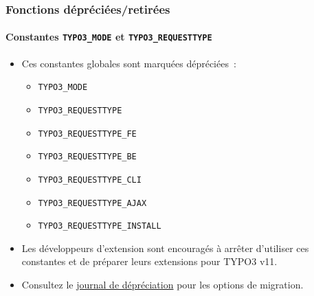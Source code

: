 %

\begin{frame}[fragile]
	\frametitle{Fonctions dépréciées/retirées}
	\framesubtitle{Constantes \texttt{TYPO3\_MODE} et \texttt{TYPO3\_REQUESTTYPE}}

	\begin{itemize}
		\item Ces constantes globales sont marquées dépréciées~:
			\begin{itemize}\smaller
				\item \texttt{TYPO3\_MODE}
				\item \texttt{TYPO3\_REQUESTTYPE}
				\item \texttt{TYPO3\_REQUESTTYPE\_FE}
				\item \texttt{TYPO3\_REQUESTTYPE\_BE}
				\item \texttt{TYPO3\_REQUESTTYPE\_CLI}
				\item \texttt{TYPO3\_REQUESTTYPE\_AJAX}
				\item \texttt{TYPO3\_REQUESTTYPE\_INSTALL}
			\end{itemize}\normalsize

		\item Les développeurs d'extension sont encouragés à arrêter d'utiliser ces constantes et
			de préparer leurs extensions pour TYPO3 v11.
		\item Consultez le \href{https://docs.typo3.org/c/typo3/cms-core/master/en-us/Changelog/11.0/Deprecation-92947-DeprecateTYPO3_MODEAndTYPO3_REQUESTTYPEConstants.html}{journal de dépréciation}
			pour les options de migration.
	\end{itemize}

\end{frame}

